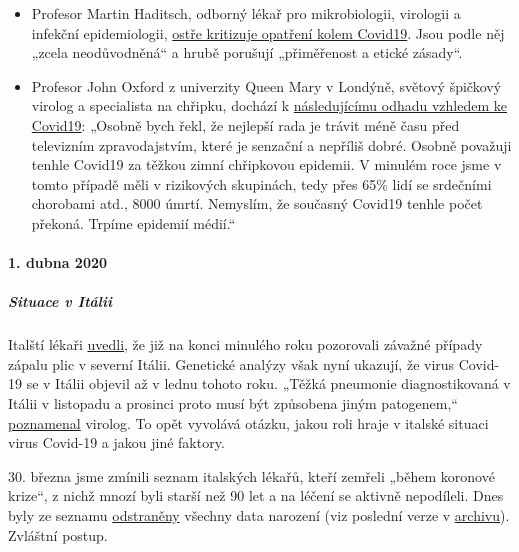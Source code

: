 \begin{itemize}
\item
  Profesor Martin Haditsch, odborný lékař pro mikrobiologii, virologii a
  infekční epidemiologii,
  \href{https://www.youtube.com/watch?v=PtzHH8DhgZM}{ostře kritizuje
  opatření kolem Covid19}. Jsou podle něj „zcela neodůvodněná`` a hrubě
  porušují „přiměřenost a etické zásady``.
\item
  Profesor John Oxford z univerzity Queen Mary v Londýně, světový
  špičkový virolog a specialista na chřipku, dochází k
  \href{https://novuscomms.com/2020/03/31/a-view-from-the-hvivo-open-orphan-orph-laboratory-professor-john-oxford/}{následujícímu
  odhadu vzhledem ke Covid19}: „Osobně bych řekl, že nejlepší rada je
  trávit méně času před televizním zpravodajstvím, které je senzační a
  nepříliš dobré. Osobně považuji tenhle Covid19 za těžkou zimní
  chřipkovou epidemii. V minulém roce jsme v tomto případě měli v
  rizikových skupinách, tedy přes 65\% lidí se srdečními chorobami atd.,
  8000 úmrtí. Nemyslím, že současný Covid19 tenhle počet překoná. Trpíme
  epidemií médií.``
\end{itemize}

\hypertarget{1-dubna-2020}{%
\paragraph{1. dubna 2020}\label{1-dubna-2020}}

\hypertarget{situace-v-ituxe1lii}{%
\subparagraph{\texorpdfstring{\textbf{Situace v
Itálii}}{Situace v Itálii}}\label{situace-v-ituxe1lii}}

Italští lékaři
\href{https://www.scmp.com/news/china/society/article/3076334/coronavirus-strange-pneumonia-seen-lombardy-november-leading}{uvedli},
že již na konci minulého roku pozorovali závažné případy zápalu plic v
severní Itálii. Genetické analýzy však nyní ukazují, že virus Covid-19
se v Itálii objevil až v lednu tohoto roku. „Těžká pneumonie
diagnostikovaná v Itálii v listopadu a prosinci proto musí být způsobena
jiným patogenem,``
\href{https://www.nzz.ch/wissenschaft/coronavirus-der-stammbaum-verraet-woher-es-kommt-ld.1548271}{poznamenal}
virolog. To opět vyvolává otázku, jakou roli hraje v italské situaci
virus Covid-19 a jakou jiné faktory.

30. března jsme zmínili seznam italských lékařů, kteří zemřeli „během
koronové krize``, z nichž mnozí byli starší než 90 let a na léčení se
aktivně nepodíleli. Dnes byly ze seznamu
\href{https://portale.fnomceo.it/elenco-dei-medici-caduti-nel-corso-dellepidemia-di-covid-19/}{odstraněny}
všechny data narození (viz poslední verze v
\href{https://web.archive.org/web/20200328152430/https://portale.fnomceo.it/elenco-dei-medici-caduti-nel-corso-dellepidemia-di-covid-19/}{archivu}).
Zvláštní postup.

